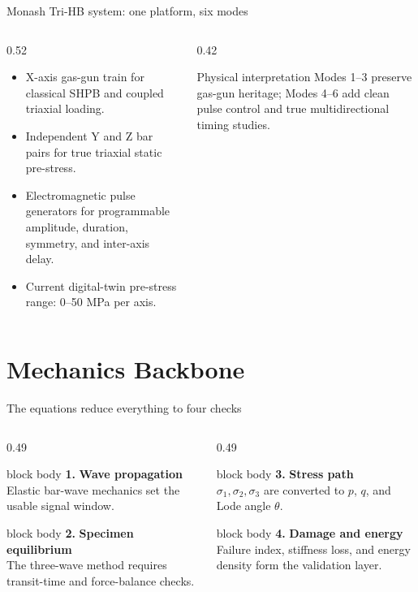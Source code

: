\documentclass[11pt,aspectratio=169]{beamer}
\newcommand{\numcard}[3]{%
  \begin{beamercolorbox}[wd=\textwidth, rounded=true, sep=0.7ex, leftskip=0.8ex, rightskip=0.8ex]{block body}
    {\large\textbf{\color{TUSTteal}#1.}} \textbf{#2}\\[2pt] #3
  \end{beamercolorbox}%
}
\begin{document}
\begin{frame}{Monash Tri-HB system: one platform, six modes}
  \begin{columns}[T,onlytextwidth]
    \begin{column}{0.52\textwidth}
      \begin{itemize}
        \item X-axis gas-gun train for classical SHPB and coupled triaxial loading.
        \item Independent Y and Z bar pairs for true triaxial static pre-stress.
        \item Electromagnetic pulse generators for programmable amplitude,
              duration, symmetry, and inter-axis delay.
        \item Current digital-twin pre-stress range: 0--50 MPa per axis.
      \end{itemize}
    \end{column}
    \begin{column}{0.42\textwidth}
      \begin{block}{Physical interpretation}
        Modes 1--3 preserve gas-gun heritage; Modes 4--6 add clean pulse
        control and true multidirectional timing studies.
      \end{block}
    \end{column}
  \end{columns}
\end{frame}

\section{Mechanics Backbone}

\begin{frame}{The equations reduce everything to four checks}
  \small
  \begin{columns}[T,onlytextwidth]
    \begin{column}{0.49\textwidth}
      \numcard{1}{Wave propagation}{Elastic bar-wave mechanics set the usable signal window.}
      \vspace{0.22cm}
      \numcard{2}{Specimen equilibrium}{The three-wave method requires transit-time and force-balance checks.}
    \end{column}
    \begin{column}{0.49\textwidth}
      \numcard{3}{Stress path}{$\sigma_1,\sigma_2,\sigma_3$ are converted to $p$, $q$, and Lode angle $\theta$.}
      \vspace{0.22cm}
      \numcard{4}{Damage and energy}{Failure index, stiffness loss, and energy density form the validation layer.}
    \end{column}
  \end{columns}
\end{frame}
\end{document}
